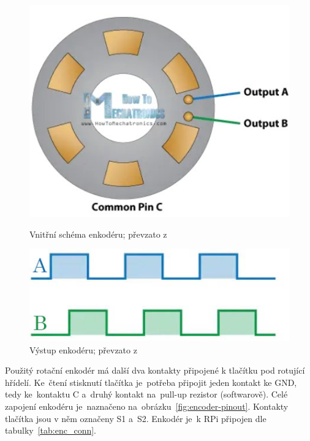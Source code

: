 \begin{figure}[htb]
  \centering
  \begin{minipage}{0.45\textwidth}
    \centering
    \includegraphics[width=1\textwidth]{img/encoder-working.jpg}
    \caption{\label{fig:encoder-working} Vnitřní schéma enkodéru; převzato z~\cite{how-encoders-work}}
  \end{minipage}\hfill
  \begin{minipage}{0.45\textwidth}
    \centering
    \includegraphics[width=1\textwidth]{img/encoder-graph.jpg}
    \caption{\label{fig:encoder-graph} Výstup enkodéru; převzato z~\cite{how-encoders-work}}
  \end{minipage}
\end{figure}

Použitý rotační enkodér má další dva kontakty připojené k tlačítku pod rotující hřídelí. Ke~čtení stisknutí tlačítka je~potřeba připojit jeden kontakt ke GND, tedy ke~kontaktu C a~druhý kontakt na~pull-up rezistor (softwarově). Celé zapojení enkodéru je~naznačeno na~obrázku~\ref{fig:encoder-pinout}. Kontakty tlačítka jsou v něm označeny S1 a~S2. Enkodér je~k RPi připojen dle tabulky~\ref{tab:enc_conn}.

